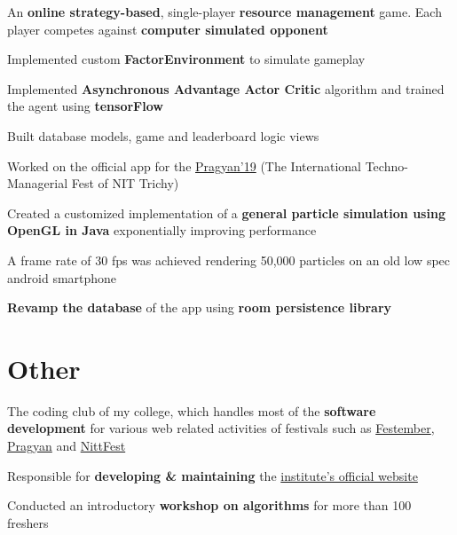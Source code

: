 \documentclass[]{deedy-resume-openfont}
\begin{document}
\begin{minipage}[t]{0.69\textwidth}
\begin{tightemize}
\item An \textbf{online strategy-based}, single-player \textbf{resource management} game. Each player competes against \textbf{computer simulated opponent} \item Implemented custom \textbf{FactorEnvironment} to simulate gameplay  \item Implemented \textbf{Asynchronous Advantage Actor Critic} algorithm and trained the agent using \textbf{tensorFlow} \item Built database models, game and leaderboard logic views
\end{tightemize}
\sectionsep

\begin{tightemize}
\item Worked on the official app for the \href{https://www.pragyan.org/19/home/}{Pragyan’19} (The International Techno-Managerial Fest of NIT Trichy) \item Created a customized implementation of a \textbf{general particle simulation using OpenGL in Java} exponentially improving performance \item A frame rate of 30 fps was achieved rendering 50,000 particles on an old low spec android smartphone \item \textbf{Revamp the database} of the app using \textbf{room persistence library}
\end{tightemize}
\sectionsep

\section{Other}
\begin{tightemize}
\item The coding club of my college, which handles most of the \textbf{software development} for various web related activities of festivals such as \href{https://festember.com}{Festember}, \href{https://www.pragyan.org}{Pragyan} and \href{https://www.nittfest.in/}{NittFest} \item Responsible for \textbf{developing \& maintaining} the \href{https://www.nitt.edu/}{institute's official website} \item Conducted an introductory \textbf{workshop on algorithms} for more than 100 freshers
\end{tightemize}
\sectionsep

\end{minipage}
\end{document}
